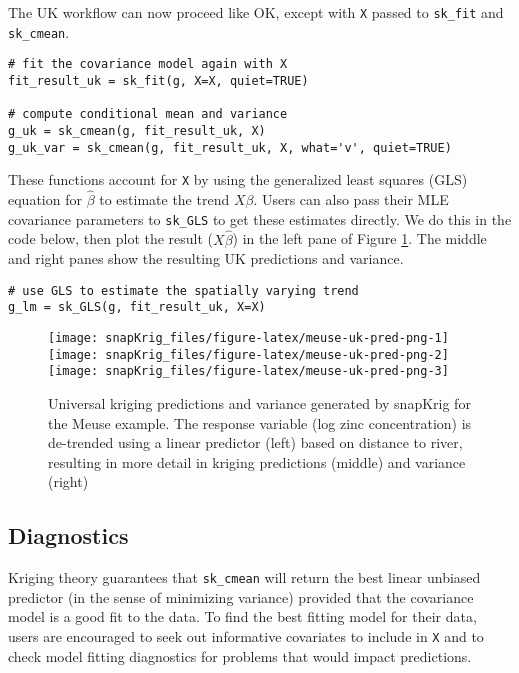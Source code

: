 The UK workflow can now proceed like OK, except with \texttt{X} passed to \texttt{sk\_fit} and \texttt{sk\_cmean}.

\begin{verbatim}
# fit the covariance model again with X
fit_result_uk = sk_fit(g, X=X, quiet=TRUE)

# compute conditional mean and variance
g_uk = sk_cmean(g, fit_result_uk, X)
g_uk_var = sk_cmean(g, fit_result_uk, X, what='v', quiet=TRUE)
\end{verbatim}

These functions account for \texttt{X} by using the generalized least squares (GLS) equation for \(\hat{\beta}\) to estimate the trend \(X\beta\). Users can also pass their MLE covariance parameters to \texttt{sk\_GLS} to get these estimates directly. We do this in the code below, then plot the result (\(X\hat{\beta}\)) in the left pane of Figure \ref{fig:meuse-uk-pred-png}. The middle and right panes show the resulting UK predictions and variance.

\begin{verbatim}
# use GLS to estimate the spatially varying trend 
g_lm = sk_GLS(g, fit_result_uk, X=X)
\end{verbatim}

\begin{figure}
\texttt{[image: snapKrig\_files/figure-latex/meuse-uk-pred-png-1]} \texttt{[image: snapKrig\_files/figure-latex/meuse-uk-pred-png-2]} \texttt{[image: snapKrig\_files/figure-latex/meuse-uk-pred-png-3]} \caption{Universal kriging predictions and variance generated by snapKrig for the Meuse example. The response variable (log zinc concentration) is de-trended using a linear predictor (left) based on distance to river, resulting in more detail in kriging predictions (middle) and variance (right)}\label{fig:meuse-uk-pred-png}
\end{figure}

\hypertarget{diagnostics}{%
\subsection{Diagnostics}\label{diagnostics}}

Kriging theory guarantees that \texttt{sk\_cmean} will return the best linear unbiased predictor (in the sense of minimizing variance) provided that the covariance model is a good fit to the data. To find the best fitting model for their data, users are encouraged to seek out informative covariates to include in \texttt{X} and to check model fitting diagnostics for problems that would impact predictions.

